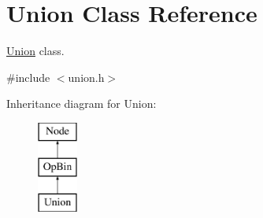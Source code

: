 \hypertarget{class_union}{
\section{\-Union \-Class \-Reference}
\label{class_union}
}


\hyperlink{class_union}{\-Union} class.  




{\ttfamily \#include $<$union.\-h$>$}

\-Inheritance diagram for \-Union\-:\begin{figure}[H]
\begin{center}
\leavevmode
\includegraphics[height=3.000000cm]{class_union}
\end{center}
\end{figure}
